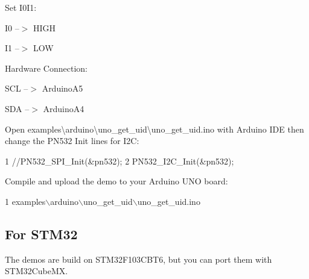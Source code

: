 \begin{DoxyEnumerate}
\item Set I0\+I1\+:
\end{DoxyEnumerate}
\begin{DoxyItemize}
\item I0 --$>$ H\+I\+G\+H
\item I1 --$>$ L\+O\+W
\end{DoxyItemize}
\begin{DoxyEnumerate}
\item Hardware Connection\+:
\end{DoxyEnumerate}
\begin{DoxyItemize}
\item S\+C\+L --$>$ Arduino\+A5
\item S\+D\+A --$>$ Arduino\+A4
\end{DoxyItemize}
\begin{DoxyEnumerate}
\item Open examples\textbackslash{}arduino\textbackslash{}uno\+\_\+get\+\_\+uid\textbackslash{}uno\+\_\+get\+\_\+uid.\+ino with Arduino I\+D\+E then change the P\+N532 Init lines for I2\+C\+: 
\begin{DoxyCode}
1 //PN532\_SPI\_Init(&pn532);
2 PN532\_I2C\_Init(&pn532);
\end{DoxyCode}

\item Compile and upload the demo to your Arduino U\+N\+O board\+: 
\begin{DoxyCode}
1 examples\(\backslash\)arduino\(\backslash\)uno\_get\_uid\(\backslash\)uno\_get\_uid.ino
\end{DoxyCode}

\end{DoxyEnumerate}

\subsection*{For S\+T\+M32}

The demos are build on S\+T\+M32\+F103\+C\+B\+T6, but you can port them with S\+T\+M32\+Cube\+M\+X.


